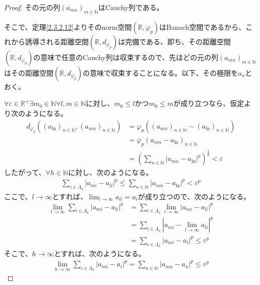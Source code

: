 \documentclass[dvipdfmx]{jsarticle}
\begin{document}
\begin{proof}
その元の列$\left( a_{mn} \right)_{m \in \mathbb{N}}$はCauchy列である。\par
そこで、定理\ref{2.3.2.12}よりそのnorm空間$\left( \mathbb{R},\varphi_{p} \right)$はBanach空間であるから、これから誘導される距離空間$\left( \mathbb{R},d_{\varphi_{p}} \right)$は完備である、即ち、その距離空間$\left( \mathbb{R},d_{\varphi_{p}} \right)$の意味で任意のCauchy列は収束するので、先ほどの元の列$\left( a_{mn} \right)_{m \in \mathbb{N}}$はその距離空間$\left( \mathbb{R},d_{\varphi_{p}} \right)$の意味で収束することになる。以下、その極限を$a_{n}$とおく。\par
$\forall\varepsilon \in \mathbb{R}^{+}\exists m_{0} \in \mathbb{N}\forall l,m \in \mathbb{N}$に対し、$m_{0} \leq l$かつ$m_{0} \leq m$が成り立つなら、仮定より次のようになる。
\begin{align*}
d_{\varphi_{p}}\left( \left( a_{\ln} \right)_{n \in \mathbb{N}},\left( a_{mn} \right)_{n \in \mathbb{N}} \right) &= \varphi_{p}\left( \left( a_{mn} \right)_{n \in \mathbb{N}} - \left( a_{\ln} \right)_{n \in \mathbb{N}} \right)\\
&= \varphi_{p}\left( a_{mn} - a_{\ln} \right)_{n \in \mathbb{N}}\\
&= \left( \sum_{n \in \mathbb{N}} \left| a_{mn} - a_{\ln} \right|^{p} \right)^{\frac{1}{p}} < \varepsilon
\end{align*}
したがって、$\forall h \in \mathbb{N}$に対し、次のようになる。
\begin{align*}
\sum_{i \in \varLambda_{h}} \left| a_{mi} - a_{li} \right|^{p} \leq \sum_{n \in \mathbb{N}} \left| a_{mn} - a_{\ln} \right|^{p} < \varepsilon^{p}
\end{align*}
ここで、$l \rightarrow \infty$とすれば、$\lim_{l \rightarrow \infty}a_{li} = a_{i}$が成り立つので、次のようになる。
\begin{align*}
\lim_{l \rightarrow \infty}{\sum_{i \in \varLambda_{h}} \left| a_{mi} - a_{li} \right|^{p}} &= \sum_{i \in \varLambda_{h}} {\lim_{l \rightarrow \infty}\left| a_{mi} - a_{li} \right|^{p}}\\
&= \sum_{i \in \varLambda_{h}} \left| a_{mi} - \lim_{l \rightarrow \infty}a_{li} \right|^{p}\\
&= \sum_{i \in \varLambda_{h}} \left| a_{mi} - a_{i} \right|^{p} \leq \varepsilon^{p}
\end{align*}
そこで、$h \rightarrow \infty$とすれば、次のようになる。
\begin{align*}
\lim_{h \rightarrow \infty}{\sum_{i \in \varLambda_{h}} \left| a_{mi} - a_{i} \right|^{p}} = \sum_{n \in \mathbb{N}} \left| a_{mn} - a_{n} \right|^{p} \leq \varepsilon^{p}

\end{align*}
\end{proof}
\end{document}
